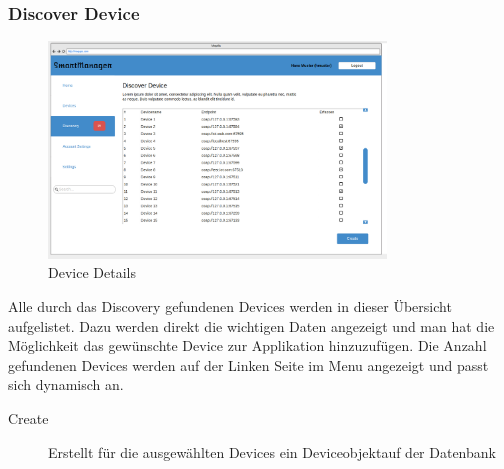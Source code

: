 \subsubsection{Discover Device}
\begin{figure} [H]
	\begin{center}
	\includegraphics[width=0.80\textwidth]{../03_Design/images/devicediscover.png}
	\caption{Device Details}
	\end{center}
\end{figure}
Alle durch das Discovery gefundenen Devices werden in dieser Übersicht aufgelistet. Dazu werden direkt die wichtigen Daten angezeigt und man hat die Möglichkeit das gewünschte Device zur Applikation hinzuzufügen. Die Anzahl gefundenen Devices werden auf der Linken Seite im Menu angezeigt und passt sich dynamisch an.

\begin{description}
\item [Create] Erstellt für die ausgewählten Devices ein Deviceobjektauf der Datenbank
\end{description}